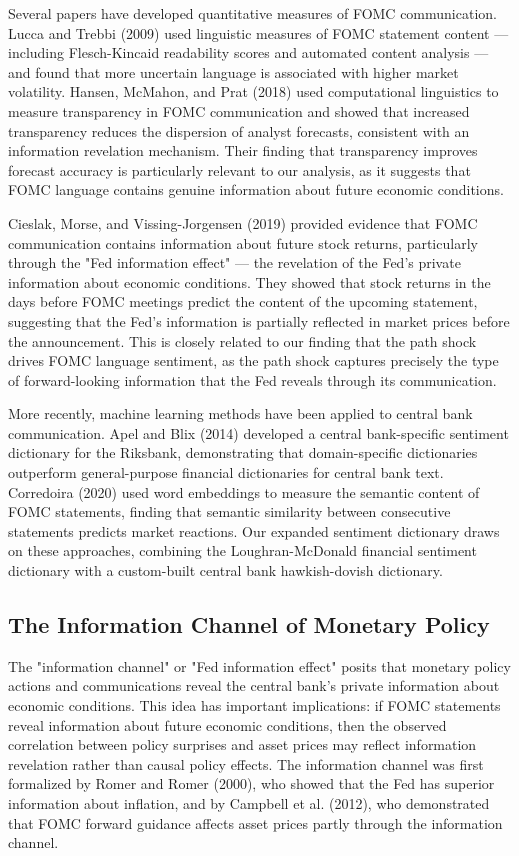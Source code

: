 Several papers have developed quantitative measures of FOMC communication. Lucca and Trebbi (2009) used linguistic measures of FOMC statement content --- including Flesch-Kincaid readability scores and automated content analysis --- and found that more uncertain language is associated with higher market volatility. Hansen, McMahon, and Prat (2018) used computational linguistics to measure transparency in FOMC communication and showed that increased transparency reduces the dispersion of analyst forecasts, consistent with an information revelation mechanism. Their finding that transparency improves forecast accuracy is particularly relevant to our analysis, as it suggests that FOMC language contains genuine information about future economic conditions.

Cieslak, Morse, and Vissing-Jorgensen (2019) provided evidence that FOMC communication contains information about future stock returns, particularly through the "Fed information effect" --- the revelation of the Fed's private information about economic conditions. They showed that stock returns in the days before FOMC meetings predict the content of the upcoming statement, suggesting that the Fed's information is partially reflected in market prices before the announcement. This is closely related to our finding that the path shock drives FOMC language sentiment, as the path shock captures precisely the type of forward-looking information that the Fed reveals through its communication.

More recently, machine learning methods have been applied to central bank communication. Apel and Blix (2014) developed a central bank-specific sentiment dictionary for the Riksbank, demonstrating that domain-specific dictionaries outperform general-purpose financial dictionaries for central bank text. Corredoira (2020) used word embeddings to measure the semantic content of FOMC statements, finding that semantic similarity between consecutive statements predicts market reactions. Our expanded sentiment dictionary draws on these approaches, combining the Loughran-McDonald financial sentiment dictionary with a custom-built central bank hawkish-dovish dictionary.

\subsection{The Information Channel of Monetary Policy}

The "information channel" or "Fed information effect" posits that monetary policy actions and communications reveal the central bank's private information about economic conditions. This idea has important implications: if FOMC statements reveal information about future economic conditions, then the observed correlation between policy surprises and asset prices may reflect information revelation rather than causal policy effects. The information channel was first formalized by Romer and Romer (2000), who showed that the Fed has superior information about inflation, and by Campbell et al. (2012), who demonstrated that FOMC forward guidance affects asset prices partly through the information channel.

